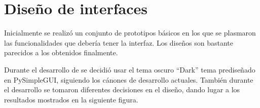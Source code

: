 
\section {Diseño de interfaces}

Inicialmente se realizó un conjunto de prototipos  básicos en los que se plasmaron las funcionalidades que debería tener la interfaz. Los diseños son bastante parecidos a los obtenidos finalmente.





Durante el desarrollo de se decidió usar el tema oscuro “Dark” tema prediseñado en PySimpleGUI, siguiendo los cánones de desarrollo actuales. También durante el desarrollo se tomaron diferentes decisiones en el diseño, dando lugar a los resultados mostrados en la siguiente figura. 


